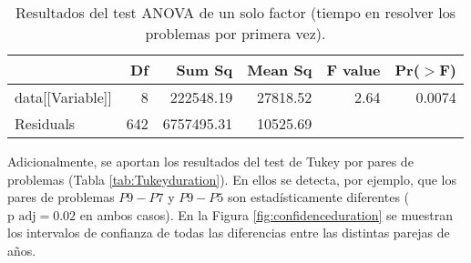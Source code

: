 \begin{table}[H]
\centering
\caption{Resultados del test ANOVA de un solo factor (tiempo en resolver los problemas por primera vez).}
\label{tab:ANOVAduration}
\begin{tabular}{lrrrrr}
  \hline
 & Df & Sum Sq & Mean Sq & F value & Pr($>$F) \\ 
  \hline
data[[Variable]] & 8 & 222548.19 & 27818.52 & 2.64 & 0.0074 \\ 
  Residuals           & 642 & 6757495.31 & 10525.69 &  &  \\ 
   \hline
\end{tabular}
\end{table}

Adicionalmente, se aportan los resultados del test de Tukey por pares de problemas (Tabla \ref{tab:Tukeyduration}). En ellos se detecta, por ejemplo, que los pares de problemas $P9-P7$ y $P9-P5$ son estadísticamente diferentes ($\text{p adj} = 0.02$ en ambos casos). En la Figura \ref{fig:confidenceduration} se muestran los intervalos de confianza de todas las diferencias entre las distintas parejas de años.

